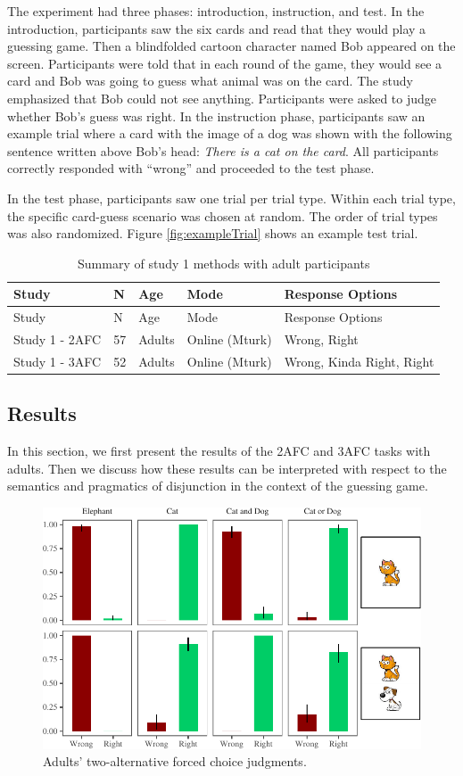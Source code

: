 \documentclass[floatsintext,man]{apa6}
\theoremstyle{definition}
\theoremstyle{definition}
\theoremstyle{definition}
\theoremstyle{remark}
\begin{document}
The experiment had three phases: introduction, instruction, and test. In
the introduction, participants saw the six cards and read that they
would play a guessing game. Then a blindfolded cartoon character named
Bob appeared on the screen. Participants were told that in each round of
the game, they would see a card and Bob was going to guess what animal
was on the card. The study emphasized that Bob could not see anything.
Participants were asked to judge whether Bob's guess was right. In the
instruction phase, participants saw an example trial where a card with
the image of a dog was shown with the following sentence written above
Bob's head: \emph{There is a cat on the card}. All participants
correctly responded with \enquote{wrong} and proceeded to the test
phase.

In the test phase, participants saw one trial per trial type. Within
each trial type, the specific card-guess scenario was chosen at random.
The order of trial types was also randomized. Figure
\ref{fig:exampleTrial} shows an example test trial.

\begin{longtable}[]{@{}lllll@{}}
\caption{\label{tab:study1info}Summary of study 1 methods with adult
participants}\tabularnewline
\toprule
Study & N & Age & Mode & Response Options\tabularnewline
\midrule
\endfirsthead
\toprule
Study & N & Age & Mode & Response Options\tabularnewline
\midrule
\endhead
Study 1 - 2AFC & 57 & Adults & Online (Mturk) & Wrong,
Right\tabularnewline
Study 1 - 3AFC & 52 & Adults & Online (Mturk) & Wrong, Kinda Right,
Right\tabularnewline
\bottomrule
\end{longtable}

\subsection{Results}\label{results}

In this section, we first present the results of the 2AFC and 3AFC tasks
with adults. Then we discuss how these results can be interpreted with
respect to the semantics and pragmatics of disjunction in the context of
the guessing game.

\begin{figure}
\centering
\includegraphics{figs/binaryAdultsPlot-1.pdf}
\caption{\label{fig:binaryAdultsPlot}Adults' two-alternative forced choice
judgments.}
\end{figure}
\end{document}
